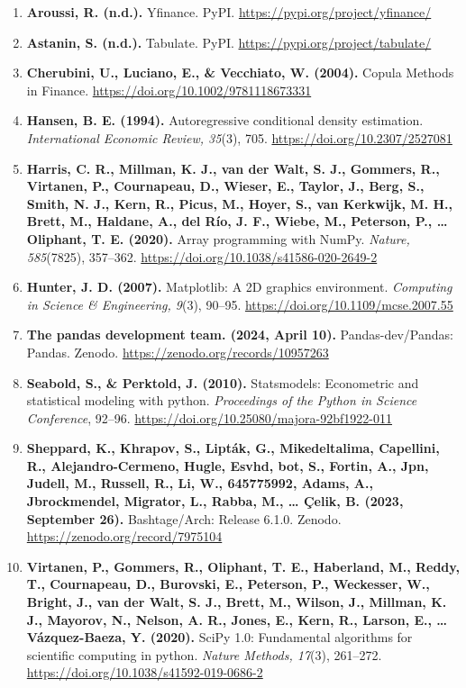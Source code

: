 \documentclass[11pt]{article}
\begin{document}
\begin{enumerate}
\def\labelenumi{\arabic{enumi}.}
\item
  \textbf{Aroussi, R. (n.d.).} Yfinance. PyPI.
  \url{https://pypi.org/project/yfinance/}
\item
  \textbf{Astanin, S. (n.d.).} Tabulate. PyPI.
  \url{https://pypi.org/project/tabulate/}
\item
  \textbf{Cherubini, U., Luciano, E., \& Vecchiato, W. (2004).} Copula
  Methods in Finance. \url{https://doi.org/10.1002/9781118673331}
\item
  \textbf{Hansen, B. E. (1994).} Autoregressive conditional density
  estimation. \emph{International Economic Review, 35}(3), 705.
  \url{https://doi.org/10.2307/2527081}
\item
  \textbf{Harris, C. R., Millman, K. J., van der Walt, S. J., Gommers,
  R., Virtanen, P., Cournapeau, D., Wieser, E., Taylor, J., Berg, S.,
  Smith, N. J., Kern, R., Picus, M., Hoyer, S., van Kerkwijk, M. H.,
  Brett, M., Haldane, A., del Río, J. F., Wiebe, M., Peterson, P.,
  \ldots{} Oliphant, T. E. (2020).} Array programming with NumPy.
  \emph{Nature, 585}(7825), 357--362.
  \url{https://doi.org/10.1038/s41586-020-2649-2}
\item
  \textbf{Hunter, J. D. (2007).} Matplotlib: A 2D graphics environment.
  \emph{Computing in Science \& Engineering, 9}(3), 90--95.
  \url{https://doi.org/10.1109/mcse.2007.55}
\item
  \textbf{The pandas development team. (2024, April 10).}
  Pandas-dev/Pandas: Pandas. Zenodo.
  \url{https://zenodo.org/records/10957263}
\item
  \textbf{Seabold, S., \& Perktold, J. (2010).} Statsmodels: Econometric
  and statistical modeling with python. \emph{Proceedings of the Python
  in Science Conference}, 92--96.
  \url{https://doi.org/10.25080/majora-92bf1922-011}
\item
  \textbf{Sheppard, K., Khrapov, S., Lipták, G., Mikedeltalima,
  Capellini, R., Alejandro-Cermeno, Hugle, Esvhd, bot, S., Fortin, A.,
  Jpn, Judell, M., Russell, R., Li, W., 645775992, Adams, A.,
  Jbrockmendel, Migrator, L., Rabba, M., \ldots{} Çelik, B. (2023,
  September 26).} Bashtage/Arch: Release 6.1.0. Zenodo.
  \url{https://zenodo.org/record/7975104}
\item
  \textbf{Virtanen, P., Gommers, R., Oliphant, T. E., Haberland, M.,
  Reddy, T., Cournapeau, D., Burovski, E., Peterson, P., Weckesser, W.,
  Bright, J., van der Walt, S. J., Brett, M., Wilson, J., Millman, K.
  J., Mayorov, N., Nelson, A. R., Jones, E., Kern, R., Larson, E.,
  \ldots{} Vázquez-Baeza, Y. (2020).} SciPy 1.0: Fundamental algorithms
  for scientific computing in python. \emph{Nature Methods, 17}(3),
  261--272. \url{https://doi.org/10.1038/s41592-019-0686-2}
\end{enumerate}


    
    
    
\end{document}
